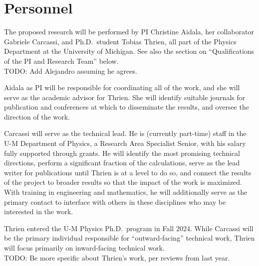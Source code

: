 \section{Personnel}
The proposed research will be performed by PI Christine Aidala, her collaborator Gabriele Carcassi, and Ph.D.~student Tobias Thrien, all part of the Physics Department at the University of Michigan.  See also the section on ``Qualifications of the PI and Research Team'' below.  \\
TODO: Add Alejandro assuming he agrees.

Aidala as PI will be responsible for coordinating all of the work, and she will serve as the academic advisor for Thrien.  She will identify suitable journals for publication and conferences at which to disseminate the results, and oversee the direction of the work.  

Carcassi will serve as the technical lead.  He is (currently part-time) staff in the U-M Department of Physics, a Research Area Specialist Senior, with his salary fully supported through grants.  He will identify the most promising technical directions, perform a significant fraction of the calculations, serve as the lead writer for publications until Thrien is at a level to do so, and connect the results of the project to broader results so that the impact of the work is maximized.  With training in engineering and mathematics, he will additionally serve as the primary contact to interface with others in these disciplines who may be interested in the work.

Thrien entered the U-M Physics Ph.D.~program in Fall 2024.  While Carcassi will be the primary individual responsible for ``outward-facing'' technical work, Thrien will focus primarily on inward-facing technical work.  \\
TODO: Be more specific about Thrien's work, per reviews from last year.






